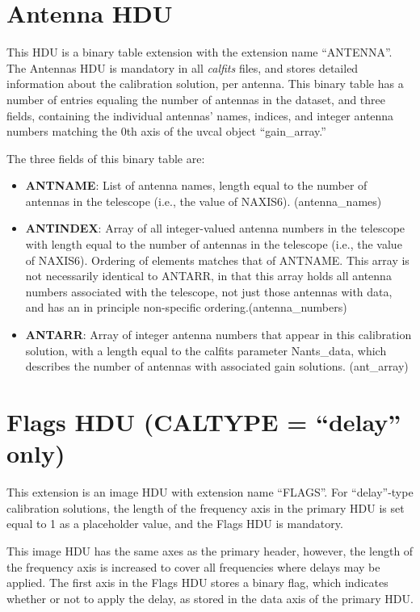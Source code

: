 \documentclass[11pt, oneside, english]{article}   	%
\begin{document}
\section{Antenna HDU}
This HDU is a binary table extension with the extension name ``ANTENNA''.
The Antennas HDU is mandatory in all \emph{calfits} files, and stores detailed information about the calibration solution, per antenna.
This binary table has a number of entries equaling the number of antennas in the dataset, and three fields, containing the individual antennas' names, indices, and integer antenna numbers matching the 0th axis of the uvcal object ``gain\_array.''

The three fields of this binary table are:
\begin{itemize}
\item{\textbf{ANTNAME}: List of antenna names, length equal to the number of antennas in the telescope (i.e., the value of NAXIS6). (antenna\_names)}
\item{\textbf{ANTINDEX}: Array of all integer-valued antenna numbers in the telescope with length equal to the number of antennas in the telescope (i.e., the value of NAXIS6). 
Ordering of elements matches that of ANTNAME. 
This array is not necessarily identical to ANTARR, in that this array holds all antenna numbers associated with the telescope, not just those antennas with data, and has an in principle non-specific ordering.(antenna\_numbers)}
\item{\textbf{ANTARR}: Array of integer antenna numbers that appear in this calibration solution, with a length equal to the calfits parameter Nants\_data, which describes the number of antennas with associated gain solutions. (ant\_array)}

\end{itemize}

\section{Flags HDU (CALTYPE = ``delay'' only)}
This extension is an image HDU with extension name ``FLAGS''.
For ``delay''-type calibration solutions, the length of the frequency axis in the primary HDU is set equal to 1 as a placeholder value, and the Flags HDU is mandatory.

This image HDU has the same axes as the primary header, however, the length of the frequency axis is increased to cover all frequencies where delays may be applied.
The first axis in the Flags HDU stores a binary flag, which indicates whether or not to apply the delay, as stored in the data axis of the primary HDU.
\end{document}
